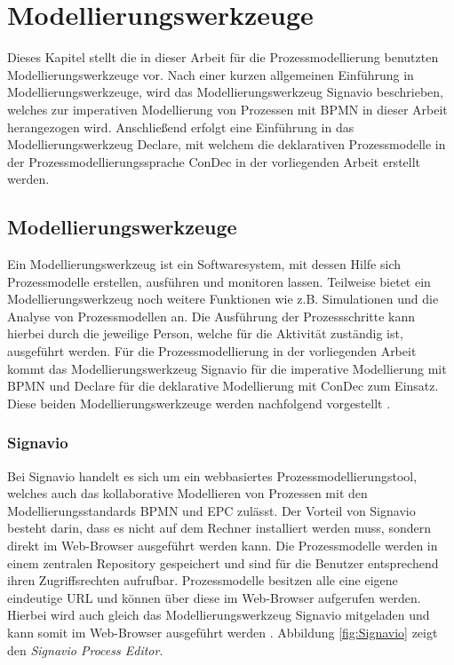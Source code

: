 \chapter{Modellierungswerkzeuge}\label{sec:chapter4}
Dieses Kapitel stellt die in dieser Arbeit für die Prozessmodellierung benutzten Modellierungswerkzeuge vor. Nach einer kurzen allgemeinen Einführung in Modellierungswerkzeuge, wird das Modellierungswerkzeug Signavio beschrieben, welches zur imperativen Modellierung von Prozessen mit BPMN in dieser Arbeit herangezogen wird. Anschließend erfolgt eine Einführung in das Modellierungswerkzeug Declare, mit welchem die deklarativen Prozessmodelle in der Prozessmodellierungssprache ConDec in der vorliegenden Arbeit erstellt werden. 

\section{Modellierungswerkzeuge}\label{sec:chapter4:Modellierungswerkzeuge}
Ein Modellierungswerkzeug ist ein Softwaresystem, mit dessen Hilfe sich Prozessmodelle erstellen, ausführen und monitoren lassen. Teilweise bietet ein Modellierungswerkzeug noch weitere Funktionen wie z.B. Simulationen und die Analyse von Prozessmodellen an. Die Ausführung der Prozessschritte kann hierbei durch die jeweilige Person, welche für die Aktivität zuständig ist, ausgeführt werden. Für die Prozessmodellierung in der vorliegenden Arbeit kommt das Modellierungswerkzeug Signavio für die imperative Modellierung mit BPMN und Declare für die deklarative Modellierung mit ConDec zum Einsatz. Diese beiden Modellierungswerkzeuge werden nachfolgend vorgestellt \cite{gadatsch2012}.

\subsection{Signavio}

Bei Signavio handelt es sich um ein webbasiertes Prozessmodellierungstool, welches auch das kollaborative Modellieren von Prozessen mit den Modellierungsstandards BPMN und EPC zulässt. Der Vorteil von Signavio besteht darin, dass es nicht auf dem Rechner installiert werden muss, sondern direkt im Web-Browser ausgeführt werden kann. Die Prozessmodelle werden in einem zentralen Repository gespeichert und sind für die Benutzer entsprechend ihren Zugriffsrechten aufrufbar. Prozessmodelle besitzen alle eine eigene eindeutige URL und können über diese im Web-Browser aufgerufen werden. Hierbei wird auch gleich das Modellierungswerkzeug Signavio mitgeladen und kann somit im Web-Browser ausgeführt werden \cite{quteprints}. \newline
Abbildung \ref{fig:Signavio} zeigt den \textit{Signavio Process Editor}.

